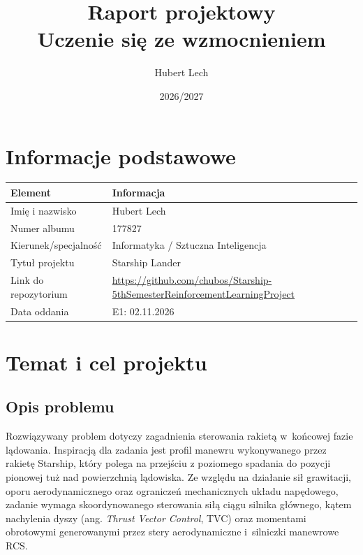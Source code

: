 \documentclass[12pt]{article}
\title{Raport projektowy\\Uczenie się ze wzmocnieniem}
\author{Hubert Lech}
\date{2026/2027}
\begin{document}
\maketitle
\tableofcontents
\newpage

\section{Informacje podstawowe}

\begin{center}
\begin{tabular}{p{}p{}}
\toprule
Element & Informacja \\
\midrule
Imię i nazwisko & Hubert Lech \\
Numer albumu & 177827 \\
Kierunek/specjalność & Informatyka / Sztuczna Inteligencja \\
Tytuł projektu & Starship Lander \\
Link do repozytorium & \url{https://github.com/chubos/Starship-5thSemesterReinforcementLearningProject} \\
Data oddania & E1: 02.11.2026 \\
\bottomrule
\end{tabular}
\end{center}

\section{Temat i cel projektu}

\subsection{Opis problemu}

Rozwiązywany problem dotyczy zagadnienia sterowania rakietą w~końcowej fazie lądowania. Inspiracją dla zadania jest profil manewru wykonywanego przez rakietę Starship, który polega na przejściu z poziomego spadania do pozycji pionowej tuż nad powierzchnią lądowiska. Ze względu na działanie sił grawitacji, oporu aerodynamicznego oraz ograniczeń mechanicznych układu napędowego, zadanie wymaga skoordynowanego sterowania siłą ciągu silnika głównego, kątem nachylenia dyszy (ang. \textit{Thrust Vector Control}, TVC) oraz momentami obrotowymi generowanymi przez stery aerodynamiczne i~silniczki manewrowe RCS.
\end{document}
